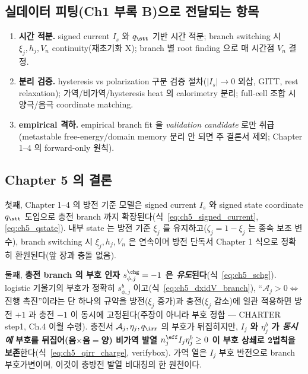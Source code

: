 \subsection{실데이터 피팅(Ch1 부록 B)으로 전달되는 항목}\label{sec:ch5_transmit}
\begin{enumerate}[label=\arabic*),leftmargin=2.0em]
\item \textbf{시간 적분.} signed current $I_s$ 와 $q_\stt$ 기반 시간 적분; branch switching 시 $\xi_j,h_j,V_n$
  continuity(재초기화 X); branch 별 root finding 으로 매 시간점 $V_n$ 결정.
\item \textbf{분리 검증.} hysteresis vs polarization 구분 검증 절차($|I_s|\to0$ 외삽, GITT, rest relaxation);
  가역/비가역/hysteresis heat 의 calorimetry 분리; full-cell 조합 시 양극/음극 coordinate matching.
\item \textbf{empirical 격하.} empirical branch fit 을 \emph{validation candidate} 로만 취급(metastable
  free-energy/domain memory 분리 안 되면 주 결론서 제외; Chapter 1--4 의 forward-only 원칙).
\end{enumerate}

\subsection{Chapter 5 의 결론}\label{sec:ch5_concl}
첫째, Chapter 1--4 의 방전 기준 모델은 signed current $I_s$ 와 signed state coordinate $q_\stt$ 도입으로 충전
branch 까지 확장된다(식~\eqref{eq:ch5_signed_current},\allowbreak\eqref{eq:ch5_qstate}). 내부 state 는 방전
기준 $\xi_j$ 를 유지하고($\zeta_j=1-\xi_j$ 는 종속 보조 변수), branch switching 시 $\xi_j,h_j,V_n$ 은 연속이며
방전 단독서 Chapter 1 식으로 정확히 환원된다(앞 장과 충돌 없음).

둘째, \textbf{충전 branch 의 부호 인자 $s_{\phi,j}^\chg=-1$ 은 \emph{유도}된다}(식~\eqref{eq:ch5_schg}). logistic
기울기의 부호가 정확히 $s_{\phi,j}^b$ 이고(식~\eqref{eq:ch5_dxidV_branch}), ``$\mathcal A_j>0\Leftrightarrow$
진행 촉진''이라는 단 하나의 규약을 방전($\xi_j$ 증가)과 충전($\xi_j$ 감소)에 일관 적용하면 방전 $+1$ 과 충전
$-1$ 이 동시에 고정된다(주장이 아니라 부호 정합 — CHARTER step1, Ch.4 이월 수령). 충전서 $\mathcal A_j,\eta_j,
q_\irr$ 의 부호가 뒤집히지만, \textbf{$I_j$ 와 $\eta_j^b$ 가 \emph{동시에} 부호를 뒤집어(음$\times$음$=$양)
비가역 발열 $n_j^{\eff}I_j\eta_j^b\ge0$ 이 부호 상쇄로 2법칙을 보존}한다(식~\eqref{eq:ch5_qirr_charge}, verifybox).
가역 열은 $I_j$ 부호 반전으로 branch 부호가변이며, 이것이 충방전 발열 비대칭의 한 원천이다.

